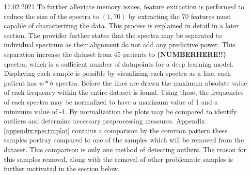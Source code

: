  
 17.02.2021
To further alleviate memory issues, feature extraction is performed to reduce the size of the spectra to $(1, 70)$ by extracting the 70 features most capable of characterizing the data. This process is explained in detail in a later section. The provider further states that the spectra may be separated to individual spectrum as their alignment do not add any predictive power. This separation increase the dataset from $45$ patients to \textbf{(NUMBERHERE!!)} spectra, which is a sufficient number of datapoints for a deep learning model. Displaying each sample is possible by visualizing each spectra as a line, each patient has $w * h$ spectra. Before the lines are drawn the maximum absolute value of each frequency within the entire dataset is found. Using these, the frequencies of each spectra may be normalized to have a maximum value of 1 and a minimum value of -1. By normalization the plots may be compared to identify outliers and determine necessary preprocessing measures. Appendix \ref{appendix:spectraplot} contains a comparison by the common pattern these samples portray compared to one of the samples which will be removed from the dataset. This comparison is only one method of detecting outliers. The reason for this samples removal, along with the removal of other problematic samples is further motivated in the section below.
